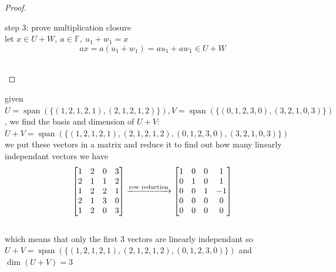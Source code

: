 \documentclass[a4paper,12pt]{article}
\DeclareMathOperator{\spn}{span}
\begin{document}
\begin{definition}
\begin{lemma}
\begin{proof}
\begin{step}
step 3: prove multiplication closure\\
let \(x \in U + W,\ a \in \mathbb{F},\ u_1 + w_1 = x\)\\
\[
ax = a(u_1 + w_1) = au_1 + aw_1 \in U + W
\]\\
\end{step}
\end{proof}
\end{lemma}
\begin{my_example}
given \(U=\spn(\{(1,2,1,2,1),(2,1,2,1,2)\}),V=\spn(\{(0,1,2,3,0),(3,2,1,0,3)\})\), we find the basis and dimension of \(U+V\):\\
\(U+V = \spn(\{(1,2,1,2,1),(2,1,2,1,2),(0,1,2,3,0),(3,2,1,0,3)\})\)\\
we put these vectors in a matrix and reduce it to find out how many linearly independant vectors we have\\
\[
\bmqty{1 & 2 & 0 & 3\\ 2 & 1 & 1 & 2\\ 1 & 2 & 2 & 1\\ 2 & 1 & 3 & 0\\ 1 & 2 & 0 & 3} \xrightarrow{\text{row reduction}} \begin{bmatrix} 1 & 0 & 0 & 1\\0 & 1 & 0 & 1\\0 & 0 & 1 & -1\\0 & 0 & 0 & 0\\0 & 0 & 0 & 0 \end{bmatrix}
\]\\
which means that only the first 3 vectors are linearly independant so \(U+V = \spn(\{(1,2,1,2,1),(2,1,2,1,2),(0,1,2,3,0)\})\) and \(\dim(U+V)=3\)\\
\end{my_example}
\end{definition}
\end{document}
